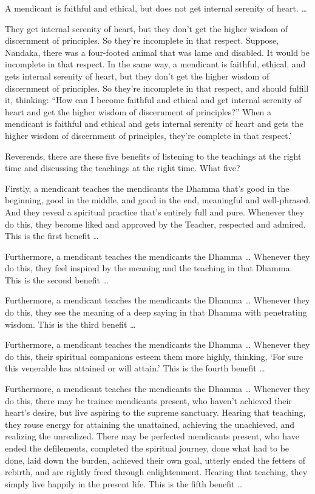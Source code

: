\documentclass[12pt,openany]{book}%
\begin{document}
A mendicant is faithful and ethical, but does not get internal serenity of heart. … 

They get internal serenity of heart, but they don’t get the higher wisdom of discernment of principles. So they’re incomplete in that respect. Suppose, Nandaka, there was a four-footed animal that was lame and disabled. It would be incomplete in that respect. In the same way, a mendicant is faithful, ethical, and gets internal serenity of heart, but they don’t get the higher wisdom of discernment of principles. So they’re incomplete in that respect, and should fulfill it, thinking: “How can I become faithful and ethical and get internal serenity of heart and get the higher wisdom of discernment of principles?” When a mendicant is faithful and ethical and gets internal serenity of heart and gets the higher wisdom of discernment of principles, they’re complete in that respect.’ 

Reverends, there are these five benefits of listening to the teachings at the right time and discussing the teachings at the right time. What five? 

Firstly, a mendicant teaches the mendicants the Dhamma that’s good in the beginning, good in the middle, and good in the end, meaningful and well-phrased. And they reveal a spiritual practice that’s entirely full and pure. Whenever they do this, they become liked and approved by the Teacher, respected and admired. This is the first benefit … 

Furthermore, a mendicant teaches the mendicants the Dhamma … Whenever they do this, they feel inspired by the meaning and the teaching in that Dhamma. This is the second benefit … 

Furthermore, a mendicant teaches the mendicants the Dhamma … Whenever they do this, they see the meaning of a deep saying in that Dhamma with penetrating wisdom. This is the third benefit … 

Furthermore, a mendicant teaches the mendicants the Dhamma … Whenever they do this, their spiritual companions esteem them more highly, thinking, ‘For sure this venerable has attained or will attain.’ This is the fourth benefit … 

Furthermore, a mendicant teaches the mendicants the Dhamma … Whenever they do this, there may be trainee mendicants present, who haven’t achieved their heart’s desire, but live aspiring to the supreme sanctuary. Hearing that teaching, they rouse energy for attaining the unattained, achieving the unachieved, and realizing the unrealized. There may be perfected mendicants present, who have ended the defilements, completed the spiritual journey, done what had to be done, laid down the burden, achieved their own goal, utterly ended the fetters of rebirth, and are rightly freed through enlightenment. Hearing that teaching, they simply live happily in the present life. This is the fifth benefit … 
\end{document}
